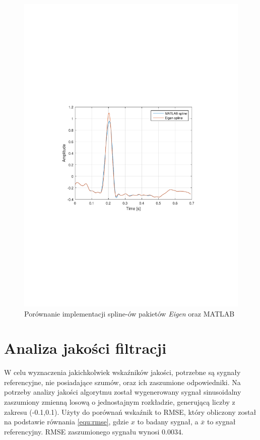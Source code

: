 \begin{figure}[!htb]
    \begin{center}
        \includegraphics[width=13cm,trim=3cm 9.2cm 4cm 10cm,clip]
        {../img/spline_comp.pdf}
    \end{center}
    \caption{Porównanie implementacji spline-ów pakietów \textit{Eigen} oraz
    \textrm{MATLAB}}
    \label{rys:comp_spline}
\end{figure}

\newpage

\section{Analiza jakości filtracji}
\indent

W celu wyznaczenia jakichkolwiek wskaźników jakości, potrzebne są sygnały
referencyjne, nie posiadające szumów, oraz ich zaszumione odpowiedniki. Na
potrzeby analizy jakości algorytmu został wygenerowany sygnał sinusoidalny
zaszumiony zmienną losową o jednostajnym rozkładzie, generującą liczby z zakresu
(-0.1,0.1). Użyty do porównań wskaźnik to RMSE, który obliczony został na
podstawie równania \eqref{equ:rmse}, gdzie $x$ to badany sygnał, a
$\overline{x}$ to sygnał referencyjny. RMSE zaszumionego sygnału wynosi
$0.0034$.

